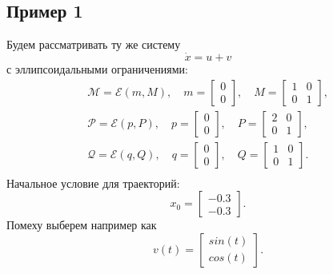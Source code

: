 \subsection{Пример 1}
Будем рассматривать ту же систему
\begin{equation*}
    \dot{x} = u + v
\end{equation*}
с эллипсоидальными ограничениями:
\begin{gather*}
    \mathcal{M} = \mathcal{E}(m, M), \quad
    m = \begin{bmatrix}
        0 \\[0.3em]
        0
    \end{bmatrix}, \quad
    M = \begin{bmatrix}
        1 & 0 \\[0.3em]
        0 & 1
    \end{bmatrix}, \\
    \mathcal{P} = \mathcal{E}(p, P), \quad
    p = \begin{bmatrix}
        0 \\[0.3em]
        0
    \end{bmatrix}, \quad
    P = \begin{bmatrix}
        2 & 0 \\[0.3em]
        0 & 1
    \end{bmatrix}, \\
    \mathcal{Q} = \mathcal{E}(q, Q), \quad
    q = \begin{bmatrix}
        0 \\[0.3em]
        0
    \end{bmatrix}, \quad
    Q = \begin{bmatrix}
        1 & 0 \\[0.3em]
        0 & 1
    \end{bmatrix}. \\
\end{gather*}
Начальное условие для траекторий:
\begin{equation*}
    x_0 = \begin{bmatrix}
        -0.3 \\[0.3em]
        -0.3
    \end{bmatrix}.
\end{equation*}
Помеху выберем например как
\begin{equation*}
    v(t) = \begin{bmatrix}
        sin(t) \\[0.3em]
        cos(t)
    \end{bmatrix}.
\end{equation*}


